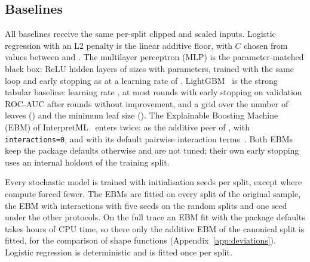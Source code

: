 \subsection{Baselines}
All baselines receive the same per-split clipped and scaled inputs. Logistic regression with an L2 penalty is the linear additive floor, with $C$ chosen from  values between  and . The multilayer perceptron (MLP) is the parameter-matched black box: ReLU hidden layers of sizes  with  parameters, trained with the same loop and early stopping as \kaam{} at a learning rate of . LightGBM~\cite{ke2017lightgbm} is the strong tabular baseline: learning rate , at most  rounds with early stopping on validation ROC-AUC after  rounds without improvement, and a grid over the number of leaves () and the minimum leaf size (). The Explainable Boosting Machine (EBM) of InterpretML~\cite{nori2019interpretml} enters twice: as the additive peer of \kaam{}, with \texttt{interactions=0}, and with its default pairwise interaction terms~\cite{lou2013ga2m}. Both EBMs keep the package defaults otherwise and are not tuned; their own early stopping uses an internal holdout of the training split.

Every stochastic model is trained with  initialisation seeds per split, except where compute forced fewer. The EBMs are fitted on every split of the original sample, the EBM with interactions with five seeds on the random splits and one seed under the other protocols. On the full trace an EBM fit with the package defaults takes hours of CPU time, so there only the additive EBM of the canonical split is fitted, for the comparison of shape functions (Appendix~\ref{app:deviations}). Logistic regression is deterministic and is fitted once per split.
